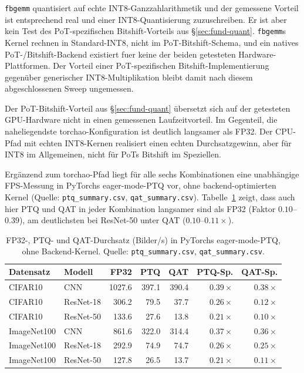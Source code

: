 \texttt{fbgemm} quantisiert auf echte INT8-Ganzzahlarithmetik und der gemessene Vorteil ist entsprechend real und einer INT8-Quantisierung zuzuschreiben. Er ist aber kein Test des PoT-spezifischen Bitshift-Vorteils aus \S\ref{sec:fund-quant}. \texttt{fbgemm}s Kernel rechnen in Standard-INT8, nicht im PoT-Bitshift-Schema, und ein natives PoT-/Bitshift-Backend existiert fuer keine der beiden getesteten Hardware-Plattformen. Der Vorteil einer PoT-spezifischen Bitshift-Implementierung gegenüber generischer INT8-Multiplikation bleibt damit nach diesem abgeschlossenen Sweep ungemessen.
\par\medskip

Der PoT-Bitshift-Vorteil aus \S\ref{sec:fund-quant} übersetzt sich auf der getesteten GPU-Hardware nicht in einen gemessenen Laufzeitvorteil. Im Gegenteil, die naheliegendste torchao-Konfiguration ist deutlich langsamer als FP32. Der CPU-Pfad mit echten INT8-Kernen realisiert einen echten Durchsatzgewinn, aber für INT8 im Allgemeinen, nicht für PoTs Bitshift im Speziellen.
\par\medskip

Ergänzend zum torchao-Pfad liegt für alle sechs Kombinationen eine unabhängige FPS-Messung in PyTorchs eager-mode-PTQ vor, ohne backend-optimierten Kernel (Quelle: \texttt{ptq\_summary.csv}, \texttt{qat\_summary.csv}). Tabelle~\ref{tab:eagerfps} zeigt, dass auch hier PTQ und QAT in jeder Kombination langsamer sind als FP32 (Faktor $0.10$--$0.39$), am deutlichsten bei ResNet-50 unter QAT ($0.10$--$0.11\times$).

\begin{table}[t]
\centering
\small
\caption{FP32-, PTQ- und QAT-Durchsatz (Bilder/s) in PyTorchs eager-mode-PTQ, ohne Backend-Kernel. Quelle: \texttt{ptq\_summary.csv}, \texttt{qat\_summary.csv}.}
\label{tab:eagerfps}
\begin{tabular}{llrrrrr}
\toprule
Datensatz & Modell & FP32 & PTQ & QAT & PTQ-Sp. & QAT-Sp. \\
\midrule
CIFAR10     & CNN       & 1027.6 & 397.1 & 390.4 & $0.39\times$ & $0.38\times$ \\
CIFAR10     & ResNet-18 &  306.2 &  79.5 &  37.7 & $0.26\times$ & $0.12\times$ \\
CIFAR10     & ResNet-50 &  133.6 &  27.6 &  13.8 & $0.21\times$ & $0.10\times$ \\
ImageNet100 & CNN       &  861.6 & 322.0 & 314.4 & $0.37\times$ & $0.36\times$ \\
ImageNet100 & ResNet-18 &  292.9 &  74.9 &  74.7 & $0.26\times$ & $0.25\times$ \\
ImageNet100 & ResNet-50 &  127.8 &  26.5 &  13.7 & $0.21\times$ & $0.11\times$ \\
\bottomrule
\end{tabular}
\end{table}

